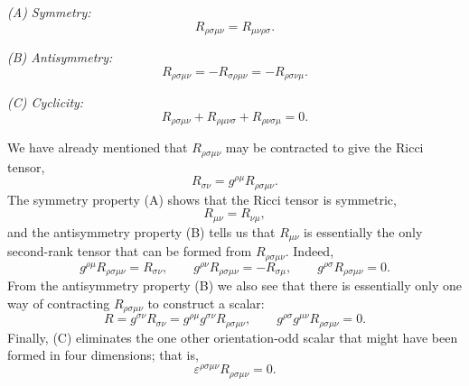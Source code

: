 \medskip
\noindent\textit{(A) Symmetry:}
\begin{equation}
  R_{\rho\sigma\mu\nu}
  =
  R_{\mu\nu\rho\sigma}.
  \tag{6.6.3}\label{eq:6.6.3}
\end{equation}

\noindent\textit{(B) Antisymmetry:}
\begin{equation}
  R_{\rho\sigma\mu\nu}
  =
  -R_{\sigma\rho\mu\nu}
  =
  -R_{\rho\sigma\nu\mu}.
  \tag{6.6.4}\label{eq:6.6.4}
\end{equation}

\noindent\textit{(C) Cyclicity:}
\begin{equation}
  R_{\rho\sigma\mu\nu}
  +R_{\rho\mu\nu\sigma}
  +R_{\rho\nu\sigma\mu}
  =0.
  \tag{6.6.5}\label{eq:6.6.5}
\end{equation}

We have already mentioned that \(R_{\rho\sigma\mu\nu}\) may be contracted to
give the Ricci tensor,
\begin{equation}
  R_{\sigma\nu}
  =
  g^{\rho\mu}R_{\rho\sigma\mu\nu}.
  \tag{6.6.6}\label{eq:6.6.6}
\end{equation}
The symmetry property (A) shows that the Ricci tensor is symmetric,
\begin{equation}
  R_{\mu\nu}=R_{\nu\mu},
  \tag{6.6.7}\label{eq:6.6.7}
\end{equation}
and the antisymmetry property (B) tells us that \(R_{\mu\nu}\) is essentially
the only second-rank tensor that can be formed from
\(R_{\rho\sigma\mu\nu}\). Indeed,
\[
  g^{\rho\mu}R_{\rho\sigma\mu\nu}
  =R_{\sigma\nu},
  \qquad
  g^{\rho\nu}R_{\rho\sigma\mu\nu}
  =-R_{\sigma\mu},
  \qquad
  g^{\rho\sigma}R_{\rho\sigma\mu\nu}=0.
\]
From the antisymmetry property (B) we also see that there is essentially only
one way of contracting \(R_{\rho\sigma\mu\nu}\) to construct a scalar:
\[
  R
  =
  g^{\sigma\nu}R_{\sigma\nu}
  =
  g^{\rho\mu}g^{\sigma\nu}R_{\rho\sigma\mu\nu},
  \qquad
  g^{\rho\sigma}g^{\mu\nu}R_{\rho\sigma\mu\nu}=0.
\]
Finally, (C) eliminates the one other orientation-odd scalar that might have
been formed in four dimensions; that is,
\[
  \varepsilon^{\rho\sigma\mu\nu}R_{\rho\sigma\mu\nu}=0.
\]
